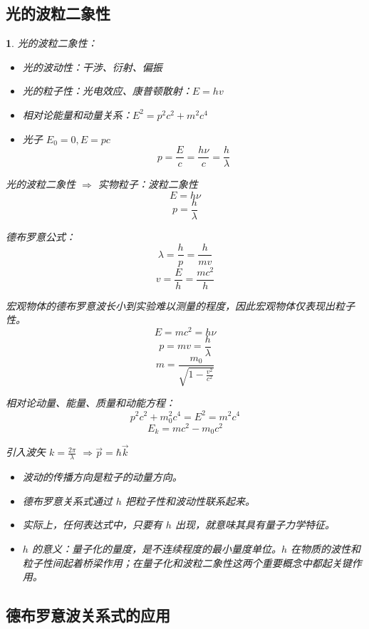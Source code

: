 \documentclass[UTF8]{report}
\theoremstyle{MyLineTheoremStyle} %
\theoremstyle{MyBlockTheoremStyle} %
\theoremstyle{MySubsubsectionStyle} %
\newtheorem{definition}{}
\begin{document}
\subsection{光的波粒二象性}
\begin{definition}
    光的波粒二象性：
    \begin{itemize}
        \item 光的波动性：干涉、衍射、偏振
        \item 光的粒子性：光电效应、康普顿散射：\(E=hv\)
        \item 相对论能量和动量关系：\(E^2 = p^2c^2 + m^2c^4\)
        \item 光子 \(E_0 = 0, E = pc\)
        \[
        p = \frac{E}{c} = \frac{h\nu}{c} = \frac{h}{\lambda}
        \]
    \end{itemize}

    光的波粒二象性 \(\Rightarrow\) 实物粒子：波粒二象性
    \[
    E = h \nu 
    \]
    \[
    p = \frac{h}{\lambda}
    \]

    德布罗意公式：
    \[
    \lambda = \frac{h}{p} = \frac{h}{mv}  
    \]
    \[
    v = \frac{E}{h} = \frac{mc^2}{h}
    \]

    宏观物体的德布罗意波长小到实验难以测量的程度，因此宏观物体仅表现出粒子性。
    \[
    E = mc^2 = h\nu
    \]
    \[
    p = mv = \frac{h}{\lambda}
    \]
    \[
    m = \frac{m_0}{\sqrt{1-\frac{v^2}{c^2}}}
    \]

    相对论动量、能量、质量和动能方程：
    \[
    p^2c^2 + m_0^2c^4 = E^2 = m^2c^4
    \]
    \[
    E_k = mc^2 - m_0c^2
    \]

    引入波矢 \(k = \frac{2\pi}{\lambda}\) \(\Longrightarrow \overrightarrow{p} = \hbar \overrightarrow{k}\)
    \begin{itemize}
        \item 波动的传播方向是粒子的动量方向。
        \item 德布罗意关系式通过 \(h\) 把粒子性和波动性联系起来。
        \item 实际上，任何表达式中，只要有 \(h\) 出现，就意味其具有量子力学特征。
        \item \(h\) 的意义：量子化的量度，是不连续程度的最小量度单位。\(h\) 在物质的波性和粒子性间起着桥梁作用；在量子化和波粒二象性这两个重要概念中都起关键作用。
    \end{itemize}
\end{definition}

\subsection{德布罗意波关系式的应用}
\end{document}

